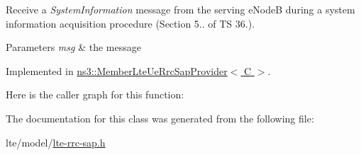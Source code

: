 Receive a {\itshape System\+Information} message from the serving e\+NodeB during a system information acquisition procedure (Section 5.. of TS 36.). 


\begin{DoxyParams}{Parameters}
{\em msg} & the message \\
\hline
\end{DoxyParams}


Implemented in \hyperlink{classns3_1_1MemberLteUeRrcSapProvider_a1032a8166d6d1e807b7669663884c6c6}{ns3\+::\+Member\+Lte\+Ue\+Rrc\+Sap\+Provider$<$ C $>$}.



Here is the caller graph for this function\+:




The documentation for this class was generated from the following file\+:\begin{DoxyCompactItemize}
\item 
lte/model/\hyperlink{lte-rrc-sap_8h}{lte-\/rrc-\/sap.\+h}\end{DoxyCompactItemize}
